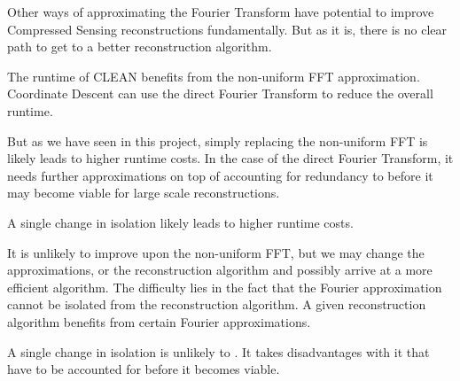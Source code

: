 Other ways of approximating the Fourier Transform have potential to improve Compressed Sensing reconstructions fundamentally. But as it is, there is no clear path to get to a better reconstruction algorithm. 


The runtime of CLEAN benefits from the non-uniform FFT approximation. Coordinate Descent can use the direct Fourier Transform to reduce the overall runtime. 






But as we have seen in this project, simply replacing the non-uniform FFT is likely leads to higher runtime costs. In the case of the direct Fourier Transform, it needs further approximations on top of accounting for redundancy to before it may become viable for large scale reconstructions. 

A single change in isolation likely leads to higher runtime costs. 


 It is unlikely to improve upon the non-uniform FFT, but we may change the approximations, or the reconstruction algorithm and possibly arrive at a more efficient algorithm. 
The difficulty lies in the fact that the Fourier approximation cannot be isolated from the reconstruction algorithm.  A given reconstruction algorithm benefits from certain Fourier approximations.

A single change in isolation is unlikely to . It takes disadvantages with it that have to be accounted for before it becomes viable.














